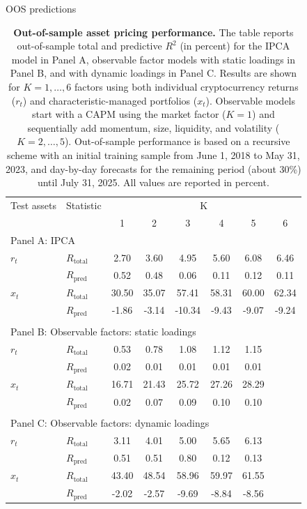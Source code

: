 \documentclass[
  12pt,
  a4paper,
  openany]{scrbook}
\begin{document}
OOS predictions

\begin{table}
\centering
\small
\caption[Out-of-sample asset pricing performance]%
{%
\textbf{Out-of-sample asset pricing performance.}
The table reports out-of-sample total and predictive $R^2$ (in percent) for the IPCA model in Panel A, observable factor models with static loadings in Panel B, and with dynamic loadings in Panel C. Results are shown for $K=1,\dots,6$ factors using both individual cryptocurrency returns ($r_t$) and characteristic-managed portfolios ($x_t$). Observable models start with a CAPM using the market factor ($K=1$) and sequentially add momentum, size, liquidity, and volatility ($K=2,\dots,5$). Out-of-sample performance is based on a recursive scheme with an initial training sample from June 1, 2018 to May 31, 2023, and day-by-day forecasts for the remaining period (about 30\%) until July 31, 2025. All values are reported in percent.
}
\label{tbl-model_comparison}
\vspace{5pt} %
\begin{tabular}{llcccccc}
\toprule
Test assets & Statistic & \multicolumn{6}{c}{K} \\
\cmidrule(lr){3-8}
 &  & 1 & 2 & 3 & 4 & 5 & 6 \\
\midrule
\multicolumn{8}{l}{Panel A: IPCA} \\
\midrule
$r_t$ & $R_{\text{total}}$ & 2.70  & 3.60  & 4.95   & 5.60  & 6.08  & 6.46 \\
      & $R_{\text{pred}}$  & 0.52  & 0.48  & 0.06   & 0.11  & 0.12  & 0.11 \\
$x_t$ & $R_{\text{total}}$ & 30.50 & 35.07 & 57.41  & 58.31 & 60.00 & 62.34 \\
      & $R_{\text{pred}}$  & -1.86 & -3.14 & -10.34 & -9.43 & -9.07 & -9.24 \\
\\[1pt]
\midrule
\multicolumn{8}{l}{Panel B: Observable factors: static loadings} \\
\midrule
$r_t$ & $R_{\text{total}}$ & 0.53  & 0.78  & 1.08  & 1.12  & 1.15 & \\
      & $R_{\text{pred}}$  & 0.02  & 0.01  & 0.01  & 0.01  & 0.01 & \\
$x_t$ & $R_{\text{total}}$ & 16.71 & 21.43 & 25.72 & 27.26 & 28.29 & \\
      & $R_{\text{pred}}$  & 0.02  & 0.07  & 0.09  & 0.10  & 0.10 & \\
\\[1pt]
\midrule
\multicolumn{8}{l}{Panel C: Observable factors: dynamic loadings} \\
\midrule
$r_t$ & $R_{\text{total}}$ & 3.11  & 4.01  & 5.00  & 5.65  & 6.13 & \\
      & $R_{\text{pred}}$  & 0.51  & 0.51  & 0.80  & 0.12  & 0.13 & \\
$x_t$ & $R_{\text{total}}$ & 43.40 & 48.54 & 58.96 & 59.97 & 61.55 & \\
      & $R_{\text{pred}}$  & -2.02 & -2.57 & -9.69 & -8.84 & -8.56 & \\
\bottomrule
\end{tabular}
\end{table}
\end{document}
